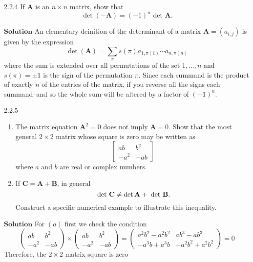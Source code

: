 \documentclass{styles/kaobook}
\begin{document}
\newpage



\begin{greenbox}{2.2.4}
If $\mathbf{A}$ is an $n \times n$ matrix, show that
$$
\operatorname{det}(-\mathbf{A})=(-1)^{n} \text { det } \mathbf{A}.
$$
\end{greenbox}
$\boxed{\textbf{Solution}}$ 
An elementary deinition of the determinant of a matrix $\mathbf{A}=(a_{i,j})$ is given by the expression 
$$\det(\mathbf{A})=\sum_{\pi}s(\pi)a_{1,\pi(1)}\cdots a_{n,\pi(n)}$$
where the sum is extended over all permutations of the set ${1,...,n}$ and $s(\pi)=\pm 1$ is the sign of the permutation $\pi$. Since each summand is the product of exactly $n$ of the entries of the matrix, if you reverse all the signs each summand--and so the whole sum-will be altered by a factor of $(-1)^{n}.$




\begin{greenbox}{2.2.5}
\begin{enumerate}[$(a)$]
\item The matrix equation $\mathbf{A}^{2}=0$ does not imply $\mathbf{A}=0 .$ Show that the most general
$2 \times 2$ matrix whose square is zero may be written as
$$
\begin{bmatrix}{a b} & {b^{2}} \\ {-a^{2}} & {-a b}\end{bmatrix}
$$
where $a$ and $b$ are real or complex numbers.
\item If $\mathbf{C}=\mathbf{A}+\mathbf{B}$, in general
$$
\text { det } \mathbf{C}\neq \operatorname{det} \mathbf{A}+\text { det } \mathbf{B} \text.
$$
Construct a specific numerical example to illustrate this inequality.
\end{enumerate}
\end{greenbox}


$\boxed{\textbf{Solution}}$ For $(a)$ first we check the condition
$$
\left(\begin{array}{cc}
a b & b^{2} \\
-a^{2} & -a b
\end{array}\right) \times\left(\begin{array}{cc}
a b & b^{2} \\
-a^{2} & -a b
\end{array}\right)=\left(\begin{array}{cc}
a^{2} b^{2}-a^{2} b^{2} & a b^{3}-a b^{3} \\
-a^{3} b+a^{3} b & -a^{2} b^{2}+a^{2} b^{2}
\end{array}\right)=0
$$
Therefore, the $2\times 2$ matrix square is zero
\end{document}
